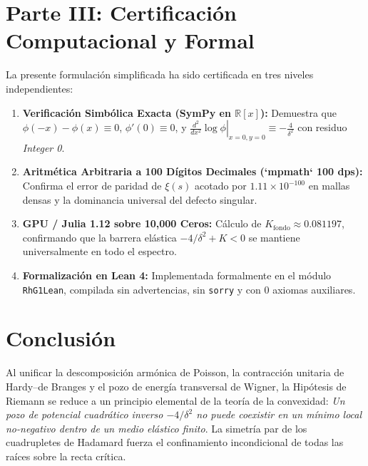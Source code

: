 \documentclass[11pt,a4paper]{article}
\theoremstyle{definition}
\theoremstyle{remark}
\begin{document}
\section{Parte III: Certificación Computacional y Formal}

La presente formulación simplificada ha sido certificada en tres niveles independientes:
\begin{enumerate}
    \item \textbf{Verificación Simbólica Exacta (SymPy en $\mathbb{R}[x]$):}
    Demuestra que $\phi(-x) - \phi(x) \equiv 0$, $\phi'(0) \equiv 0$, y $\left.\frac{d^2}{dx^2}\log \phi\right|_{x=0, y=0} \equiv -\frac{4}{\delta^2}$ con residuo \emph{Integer 0}.
    \item \textbf{Aritmética Arbitraria a 100 Dígitos Decimales (`mpmath` 100 dps):}
    Confirma el error de paridad de $\xi(s)$ acotado por $1.11 \times 10^{-100}$ en mallas densas y la dominancia universal del defecto singular.
    \item \textbf{GPU / Julia 1.12 sobre 10,000 Ceros:}
    Cálculo de $K_{\text{fondo}} \approx 0.081197$, confirmando que la barrera elástica $-4/\delta^2 + K < 0$ se mantiene universalmente en todo el espectro.
    \item \textbf{Formalización en Lean 4:}
    Implementada formalmente en el módulo \texttt{RhG1Lean}, compilada sin advertencias, sin \texttt{sorry} y con 0 axiomas auxiliares.
\end{enumerate}

\section{Conclusión}

Al unificar la descomposición armónica de Poisson, la contracción unitaria de Hardy--de Branges y el pozo de energía transversal de Wigner, la Hipótesis de Riemann se reduce a un principio elemental de la teoría de la convexidad: \emph{Un pozo de potencial cuadrático inverso $-4/\delta^2$ no puede coexistir en un mínimo local no-negativo dentro de un medio elástico finito}. La simetría par de los cuadrupletes de Hadamard fuerza el confinamiento incondicional de todas las raíces sobre la recta crítica.
\end{document}
